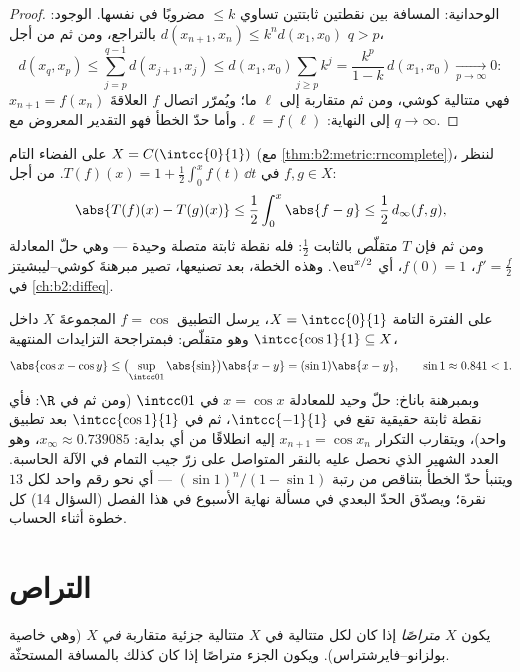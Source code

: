 \begin{proof}
الوحدانية: المسافة بين نقطتين ثابتتين تساوي $\leq k$ مضروبًا في نفسها.
الوجود: $d(x_{n+1}, x_n) \leq k^n d(x_1, x_0)$ بالتراجع، ومن ثم
من أجل $q > p$،
\[
d(x_q, x_p) \leq \sum_{j=p}^{q-1} d(x_{j+1}, x_j)
\leq d(x_1, x_0) \sum_{j \geq p} k^j
= \frac{k^p}{1-k}\, d(x_1, x_0) \xrightarrow[p\to\infty]{} 0 :
\]
فهي متتالية كوشي، ومن ثم متقاربة إلى $\ell$ ما؛ ويُمرّر اتصال $f$
العلاقةَ $x_{n+1} = f(x_n)$ إلى النهاية: $\ell = f(\ell)$. وأما حدّ الخطأ
فهو التقدير المعروض مع $q \to \infty$.
\end{proof}

\begin{example}\label{ex:b2:metric:integralequation}
على الفضاء التام $X = C(\intcc{0}{1})$ (مع
\cref{thm:b2:metric:rncomplete})، لننظر في $T(f)(x) = 1 + \frac12
\int_0^x f(t)\,\dd t$. من أجل $f, g \in X$:
\[
\abs{T(f)(x) - T(g)(x)} \leq \frac12 \int_0^x \abs{f - g} \leq
\frac12\, d_\infty(f, g),
\]
ومن ثم فإن $T$ متقلّص بالثابت $\frac12$: فله نقطة ثابتة متصلة
وحيدة --- وهي حلّ المعادلة $f' = \frac f2$، $f(0) = 1$، أي
$\eu^{x/2}$. وهذه الخطة، بعد تصنيعها، تصير
مبرهنةَ كوشي--ليبشيتز في \cref{ch:b2:diffeq}.
\end{example}

\begin{example}[نقطة ثابتة عددية: $x = \cos x$]\label{ex:b2:metric:cosfix}
على الفترة التامة $X = \intcc{0}{1}$، يرسل التطبيق $f = \cos$ المجموعةَ $X$
داخل $\intcc{\cos 1}{1} \subseteq X$ وهو متقلّص: فبمتراجحة
التزايدات المنتهية،
\[
\abs{\cos x - \cos y} \leq \bigl(\sup_{\intcc01}\abs{\sin}\bigr)
\abs{x - y} = (\sin 1)\abs{x - y},
\qquad \sin 1 \approx 0.841 < 1 .
\]
وبمبرهنة باناخ: حلّ وحيد للمعادلة $x = \cos x$ في $\intcc01$ (ومن ثم في
$\R$: فأي نقطة ثابتة حقيقية تقع في $\intcc{-1}{1}$، ثم في
$\intcc{\cos 1}{1}$ بعد تطبيق واحد)، ويتقارب التكرار
$x_{n+1} = \cos x_n$ إليه انطلاقًا من أي بداية: $x_\infty
\approx 0.739085$، وهو العدد الشهير الذي نحصل عليه بالنقر
المتواصل على زرّ جيب التمام في الآلة الحاسبة. ويتنبأ حدّ الخطأ
بتناقص من رتبة $(\sin1)^n/(1 - \sin1)$ --- أي نحو رقم واحد لكل $13$
نقرة؛ ويصدّق الحدّ البعدي في مسألة نهاية الأسبوع في هذا الفصل
(السؤال 14) كل خطوة أثناء الحساب.
\end{example}

\section{التراص}

\begin{definition}\label{def:b2:metric:compact}
يكون  $X$ \emph{متراصًا}
إذا كان لكل متتالية في $X$ متتالية جزئية متقاربة \emph{في}
$X$ (وهي خاصية بولزانو--فايرشتراس). ويكون الجزء متراصًا إذا كان
كذلك بالمسافة المستحثّة.
\end{definition}

